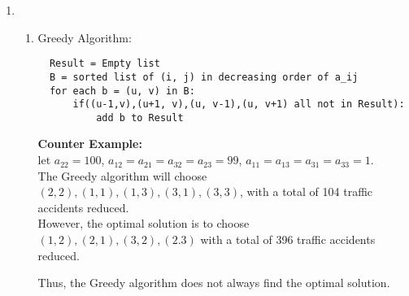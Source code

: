 \documentclass[11pt]{article}
\begin{document}
\begin{enumerate}
    \item
    \begin{enumerate}
        \item Greedy Algorithm: 
        \begin{lstlisting}
  Result = Empty list
  B = sorted list of (i, j) in decreasing order of a_ij
  for each b = (u, v) in B:
      if((u-1,v),(u+1, v),(u, v-1),(u, v+1) all not in Result):
          add b to Result
        \end{lstlisting}
        
        \textbf{Counter Example: }\\
        let $a_{22} = 100$, $a_{12} = a_{21} = a_{32} = a_{23} = 99$, $a_{11} = a_{13} = a_{31} = a_{33} = 1$.\\
        The Greedy algorithm will choose  $(2, 2), (1, 1), (1, 3), (3, 1), (3, 3)$, with a total of 104 traffic accidents reduced.\\
        However, the optimal solution is to choose $(1, 2), (2, 1), (3, 2), (2. 3)$ with a total of 396 traffic accidents reduced.\\
        
       
    
    Thus, the Greedy algorithm does not always find the optimal solution.\\[2ex]
    

\end{enumerate}
\end{enumerate}
\end{document}
